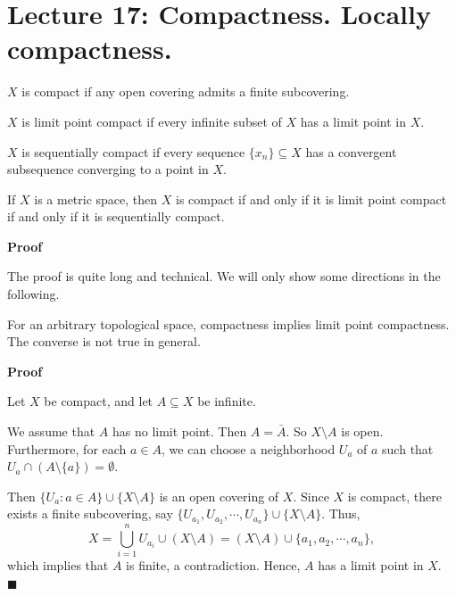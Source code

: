 \documentclass[main.tex]{subfiles}
\begin{document}
\pagestyle{plain}
\setcounter{chapter}{16}

\chapter{Lecture 17: Compactness. Locally compactness. }
\label{chap:chapter17}

\begin{definition}
    [def1]
    $X$ is compact if any open covering admits a finite subcovering. 
\end{definition}

\begin{definition}
    $X$ is limit point compact if every infinite subset of $X$ has a limit point in $X$. 
\end{definition}

\begin{definition}
    $X$ is sequentially compact if every sequence $\{x_n\} \subseteq X$ has a convergent subsequence converging to a point in $X$.
\end{definition}

\begin{theorem}
    If $X$ is a metric space, then $X$ is compact if and only if it is limit point compact if and only if it is sequentially compact.
\end{theorem}
\par \noindent \textbf{Proof} 
\par The proof is quite long and technical. We will only show some directions in the following. 

\begin{theorem}
    For an arbitrary topological space, compactness implies limit point compactness. The converse is not true in general.
\end{theorem}
\par \noindent \textbf{Proof} 
\par Let $X$ be compact, and let $A \subseteq X$ be infinite. 
\par We assume that $A$ has no limit point. Then $A = \bar{A}$. 
So $X\setminus A$ is open. Furthermore, for each $a \in A$, we can choose a neighborhood $U_a$ of $a$ such that $U_a \cap (A\setminus \{a\}) = \emptyset$.
\par Then $\{U_a: a \in A\} \cup \{X\setminus A\}$ is an open covering of $X$. Since $X$ is compact, there exists a finite subcovering, say $\{U_{a_1}, U_{a_2}, \cdots, U_{a_n}\} \cup \{X\setminus A\}$. Thus,
\[ X = \bigcup_{i=1}^n U_{a_i} \cup (X\setminus A) = (X\setminus A)\cup \{a_1, a_2, \cdots, a_n\}, \]
which implies that $A$ is finite, a contradiction. Hence, $A$ has a limit point in $X$. 
\mbox{} \\ \null \hfill $\blacksquare$ 
\end{document}
